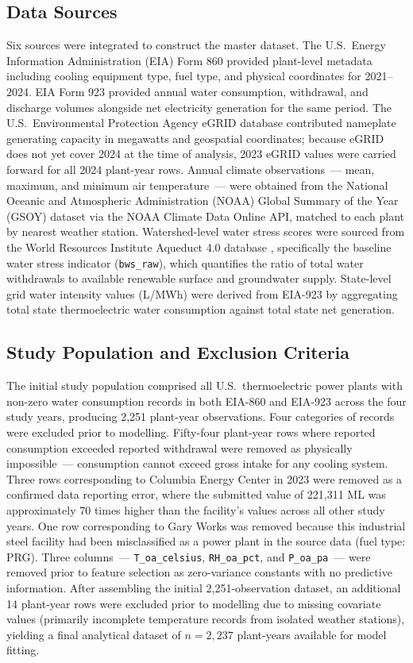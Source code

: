 \documentclass[11pt, letterpaper]{article}
\begin{document}
\subsection{Data Sources}

Six sources were integrated to construct the master dataset. The U.S.\ Energy Information Administration (EIA) Form 860 provided plant-level metadata including cooling equipment type, fuel type, and physical coordinates for 2021--2024. EIA Form 923 provided annual water consumption, withdrawal, and discharge volumes alongside net electricity generation for the same period. The U.S.\ Environmental Protection Agency eGRID database contributed nameplate generating capacity in megawatts and geospatial coordinates; because eGRID does not yet cover 2024 at the time of analysis, 2023 eGRID values were carried forward for all 2024 plant-year rows. Annual climate observations~--- mean, maximum, and minimum air temperature~--- were obtained from the National Oceanic and Atmospheric Administration (NOAA) Global Summary of the Year (GSOY) dataset \citep{lawrimore2016} via the NOAA Climate Data Online API, matched to each plant by nearest weather station. Watershed-level water stress scores were sourced from the World Resources Institute Aqueduct 4.0 database \citep{kuzma2023}, specifically the baseline water stress indicator (\texttt{bws\_raw}), which quantifies the ratio of total water withdrawals to available renewable surface and groundwater supply. State-level grid water intensity values (L/MWh) were derived from EIA-923 by aggregating total state thermoelectric water consumption against total state net generation.

\subsection{Study Population and Exclusion Criteria}

The initial study population comprised all U.S.\ thermoelectric power plants with non-zero water consumption records in both EIA-860 and EIA-923 across the four study years, producing 2{,}251 plant-year observations. Four categories of records were excluded prior to modelling. Fifty-four plant-year rows where reported consumption exceeded reported withdrawal were removed as physically impossible~--- consumption cannot exceed gross intake for any cooling system. Three rows corresponding to Columbia Energy Center in 2023 were removed as a confirmed data reporting error, where the submitted value of 221{,}311 ML was approximately 70 times higher than the facility's values across all other study years. One row corresponding to Gary Works was removed because this industrial steel facility had been misclassified as a power plant in the source data (fuel type: PRG). Three columns~--- \texttt{T\_oa\_celsius}, \texttt{RH\_oa\_pct}, and \texttt{P\_oa\_pa}~--- were removed prior to feature selection as zero-variance constants with no predictive information. After assembling the initial 2{,}251-observation dataset, an additional 14 plant-year rows were excluded prior to modelling due to missing covariate values (primarily incomplete temperature records from isolated weather stations), yielding a final analytical dataset of $n = 2{,}237$ plant-years available for model fitting.
\end{document}
